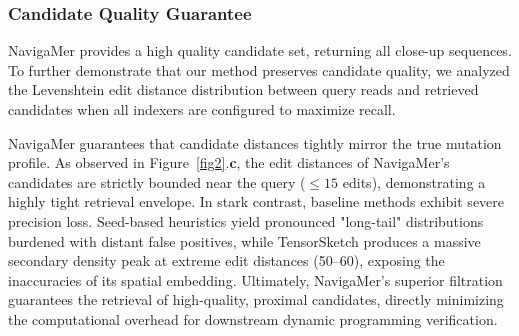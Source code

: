 \documentclass[unnumsec,webpdf,contemporary,large]{oup-authoring-template}%
\theoremstyle{thmstyleone}%
\theoremstyle{thmstyletwo}%
\theoremstyle{thmstylethree}%
\begin{document}
\subsubsection{Candidate Quality Guarantee}
NavigaMer provides a high quality candidate set, returning all close-up sequences. To further demonstrate that our method preserves candidate quality, we analyzed the Levenshtein edit distance distribution between query reads and retrieved candidates when all indexers are configured to maximize recall.

NavigaMer guarantees that candidate distances tightly mirror the true mutation profile. As observed in Figure~\ref{fig2}.\textbf{c}, the edit distances of NavigaMer's candidates are strictly bounded near the query ($\leq 15$ edits), demonstrating a highly tight retrieval envelope. In stark contrast, baseline methods exhibit severe precision loss. Seed-based heuristics yield pronounced "long-tail" distributions burdened with distant false positives, while TensorSketch produces a massive secondary density peak at extreme edit distances (50--60), exposing the inaccuracies of its spatial embedding. Ultimately, NavigaMer's superior filtration guarantees the retrieval of high-quality, proximal candidates, directly minimizing the computational overhead for downstream dynamic programming verification.









% 

\end{document}
